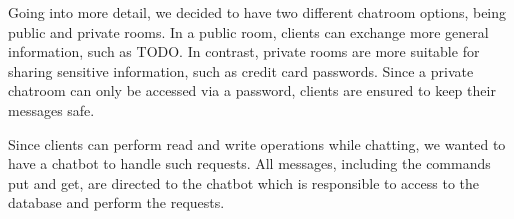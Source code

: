 Going into more detail, we decided to have two different chatroom options, being public and private rooms. In a public room, clients can exchange more general information, such as TODO. In contrast, private rooms are more suitable for sharing sensitive information, such as credit card passwords. Since a private chatroom can only be accessed via a password, clients are ensured to keep their messages safe.

Since clients can perform read and write operations while chatting, we wanted to have a chatbot to handle such requests. All messages, including the commands put and get, are directed to the chatbot which is responsible to access to the database and perform the requests.

